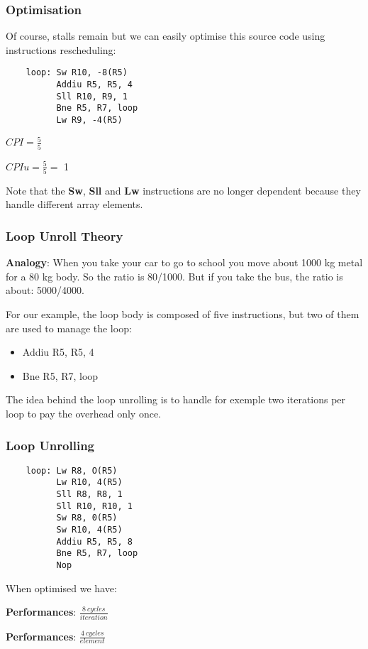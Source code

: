 
\begin{frame}[containsverbatim]
  \frametitle{Optimisation}

  Of course, stalls remain but we can easily optimise this source code
  using instructions rescheduling:

  \begin{verbatim}
    loop: Sw R10, -8(R5)
          Addiu R5, R5, 4
          Sll R10, R9, 1
          Bne R5, R7, loop
          Lw R9, -4(R5)
  \end{verbatim}

  \-

  $CPI = \frac{5}{5}$

  $CPIu = \frac{5}{5} = $ \alert{1}

  \-

  Note that the \textbf{Sw}, \textbf{Sll} and \textbf{Lw} instructions
  are no longer dependent because they handle different array elements.
\end{frame}


\begin{frame}
  \frametitle{Loop Unroll Theory}

  \textbf{Analogy}: When you take your car to go to school you move
  about 1000 kg metal for a 80 kg body. So the ratio is 80/1000. But
  if you take the bus, the ratio is about: 5000/4000.

  \-

  For our example, the loop body is composed of five instructions, but
  two of them are used to manage the loop:

  \begin{itemize}
    \item
      Addiu R5, R5, 4
    \item
      Bne R5, R7, loop
  \end{itemize}

  The idea behind the loop unrolling is to handle for exemple two
  iterations per loop to pay the overhead only once.
\end{frame}


\begin{frame}[containsverbatim]
  \frametitle{Loop Unrolling}

  \begin{verbatim}
    loop: Lw R8, O(R5)
          Lw R10, 4(R5)
          Sll R8, R8, 1
          Sll R10, R10, 1
          Sw R8, 0(R5)
          Sw R10, 4(R5)
          Addiu R5, R5, 8
          Bne R5, R7, loop
          Nop
  \end{verbatim}

  When optimised we have:

  \-

  \textbf{Performances}: $\frac{8~cycles}{iteration}$

  \textbf{Performances}: $\frac{4~cycles}{element}$
\end{frame}

